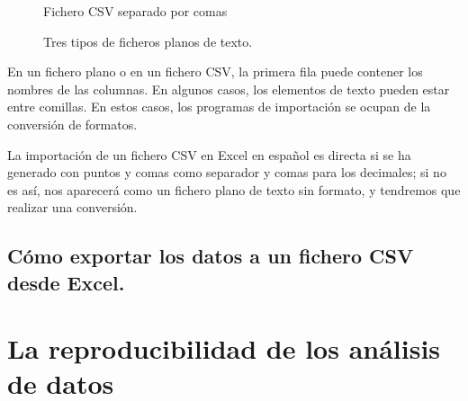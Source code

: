 \documentclass[
  letterpaper,
  DIV=11,
  numbers=noendperiod,
  oneside]{scrreprt}
\begin{document}
\begin{figure}
\begin{minipage}[b]{\linewidth}
{\centering 


\caption{Fichero CSV separado por comas}

}

\end{minipage}%

\caption{\label{fig-ficheros-texto}Tres tipos de ficheros planos de
texto.}

\end{figure}

En un fichero plano o en un fichero CSV, la primera fila puede contener
los nombres de las columnas. En algunos casos, los elementos de texto
pueden estar entre comillas. En estos casos, los programas de
importación se ocupan de la conversión de formatos.

La importación de un fichero CSV en Excel en español es directa si se ha
generado con puntos y comas como separador y comas para los decimales;
si no es así, nos aparecerá como un fichero plano de texto sin formato,
y tendremos que realizar una conversión.

\hypertarget{cuxf3mo-exportar-los-datos-a-un-fichero-csv-desde-excel.}{%
\subsection{Cómo exportar los datos a un fichero CSV desde
Excel.}\label{cuxf3mo-exportar-los-datos-a-un-fichero-csv-desde-excel.}}

\hypertarget{la-reproducibilidad-de-los-anuxe1lisis-de-datos}{%
\section{La reproducibilidad de los análisis de
datos}\label{la-reproducibilidad-de-los-anuxe1lisis-de-datos}}
\end{document}

